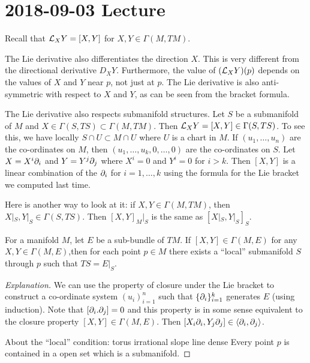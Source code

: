 \section{2018-09-03 Lecture}

Recall that $\mathcal{L}_XY=[X,Y]$ for $X,Y\in\Gamma(M,TM)$.

\begin{rmk}
  The Lie derivative also differentiates the direction $X$.
  This is very different from the directional derivative $D_XY$.
  Furthermore, the value of $(\mathcal{L}_XY)(p)$ depends on the values of $X$ and $Y$ near $p$, not just at $p$.
  The Lie derivative is also anti-symmetric with respect to $X$ and $Y$, as can be seen from the bracket formula.
\end{rmk}

\begin{rmk}
  The Lie derivative also respects submanifold structures.
  Let $S$ be a submanifold of $M$ and $X \in \Gamma(S,TS) \subset \Gamma(M,TM)$.
  Then $\mathcal{L}_XY=[X,Y]\in\Gamma(S,TS)$.
  To see this, we have locally $S \cap U \subset M \cap U$ where $U$ is a chart in $M$.
  If $(u_1,\ldots,u_n)$ are the co-ordinates on $M$, then $(u_1,\ldots,u_k,0,\ldots,0)$ are the co-ordinates on $S$.
  Let $X=X^i\partial_i$ and $Y=Y^j\partial_j$ where $X^i=0$ and $Y^i=0$ for $i>k$.
  Then $[X,Y]$ is a linear combination of the $\partial_i$ for $i=1,\ldots,k$ using the formula for the Lie bracket we computed last time.
  
  Here is another way to look at it: if $X,Y\in\Gamma(M,TM)$, then $X|_S,Y|_S\in\Gamma(S,TS)$.
  Then $[X,Y]_M|_S$ is the same as $[X|_S,Y|_S]_S$.
\end{rmk}

\begin{thm}[Frobenius]
  For a manifold $M$, let $E$ be a sub-bundle of $TM$.
  If $[X,Y]\in\Gamma(M,E)$ for any $X,Y\in\Gamma(M,E)$,then for each point $p \in M$ there exists a ``local'' submanifold $S$ through $p$ such that $TS=E|_S$.
\end{thm}

\begin{proof}[Explanation]
  We can use the property of closure under the Lie bracket to construct a co-ordinate system $(u_i)_{i=1}^n$ such that $\{\partial_i\}_{i=1}^k$ generates $E$ (using induction).
  Note that $[\partial_i.\partial_j]=0$ and this property is in some sense equivalent to the closure property $[X,Y]\in\Gamma(M,E)$.
  Then $[X_i\partial_i,Y_j\partial_j]\in{\left\langle \partial_i,\partial_j \right\rangle}$.

  About the ``local'' condition: torus irrational slope line dense
  Every point $p$ is contained in a open set which is a submanifold.
\end{proof}


